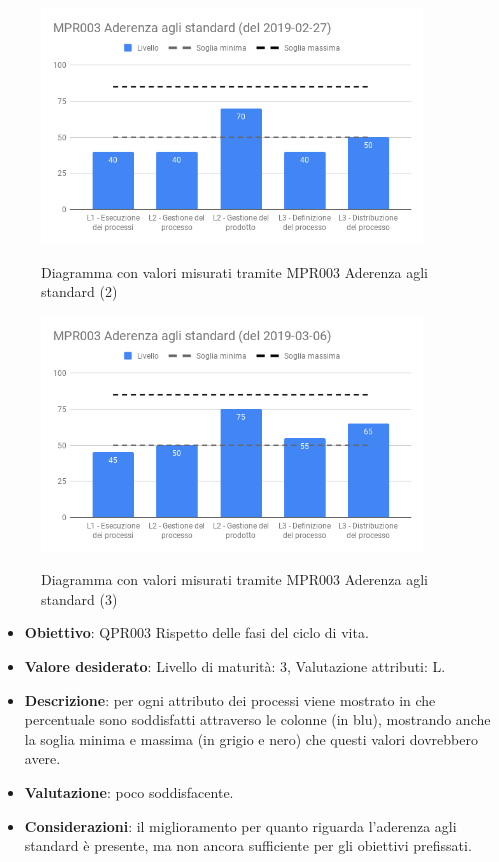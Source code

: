     \begin{figure}[H]
        \centering
        \includegraphics[width=0.9\textwidth]{img/cruscotti/RP/MPR003(2).png}
        \label{immagineAderenzaStandard2RP}
        \caption{Diagramma con valori misurati tramite MPR003 Aderenza agli standard (2)}
    \end{figure}

    \begin{figure}[H]
        \centering
        \includegraphics[width=0.9\textwidth]{img/cruscotti/RP/MPR003(3).png}
        \label{immagineAderenzaStandard3RP}
        \caption{Diagramma con valori misurati tramite MPR003 Aderenza agli standard (3)}
    \end{figure}

	\begin{itemize}
		\item \textbf{Obiettivo}: QPR003 Rispetto delle fasi del ciclo di vita.
		\item \textbf{Valore desiderato}: Livello di maturità: 3, Valutazione attributi: L.
		\item \textbf{Descrizione}: per ogni attributo dei processi viene mostrato in che percentuale sono soddisfatti attraverso le colonne (in blu), mostrando anche la soglia minima e massima (in grigio e nero) che questi valori dovrebbero avere.
		\item \textbf{Valutazione}: poco soddisfacente.
		\item \textbf{Considerazioni}: il miglioramento per quanto riguarda l'aderenza agli standard è presente, ma non ancora sufficiente per gli obiettivi prefissati.
	\end{itemize}


